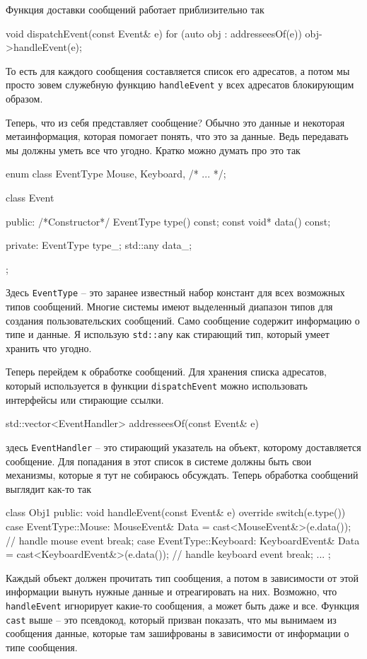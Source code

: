 Функция доставки сообщений работает приблизительно так
\begin{cppcode}
void dispatchEvent(const Event& e) {
  for (auto obj : addresseesOf(e)) {
    obj->handleEvent(e);
  }
}
\end{cppcode}
То есть для каждого сообщения составляется список его адресатов, а потом мы просто зовем служебную функцию \verb"handleEvent" у всех адресатов блокирующим образом.

Теперь, что из себя представляет сообщение?
Обычно это данные и некоторая метаинформация, которая помогает понять, что это за данные.
Ведь передавать мы должны уметь все что угодно.
Кратко можно думать про это так
\begin{cppcode}
enum class EventType {
  Mouse,
  Keyboard,
  /* ... */};

class Event {
public:
  /*Constructor*/
  EventType type() const;
  const void* data() const;
  
private:
  EventType type_;
  std::any data_;
};
\end{cppcode}
Здесь \verb"EventType" -- это заранее известный набор констант для всех возможных типов сообщений.
Многие системы имеют выделенный диапазон типов для создания пользовательских сообщений.
Само сообщение содержит информацию о типе и данные.
Я использую \verb"std::any" как стирающий тип, который умеет хранить что угодно.

Теперь перейдем к обработке сообщений.
Для хранения списка адресатов, который используется в функции \verb"dispatchEvent" можно использовать интерфейсы или стирающие ссылки.
\begin{cppcode}
std::vector<EventHandler> addresseesOf(const Event& e)
\end{cppcode}
здесь \verb"EventHandler" -- это стирающий указатель на объект, которому доставляется сообщение.
Для попадания в этот список в системе должны быть свои механизмы, которые я тут не собираюсь обсуждать.
Теперь обработка сообщений выглядит как-то так
\begin{cppcode}
class Obj1 {
public:
  void handleEvent(const Event& e) override {
    switch(e.type()) {
      case EventType::Mouse:
        MouseEvent& Data = cast<MouseEvent&>(e.data());
        // handle mouse event
      break;
      case EventType::Keyboard:
        KeyboardEvent& Data = cast<KeyboardEvent&>(e.data());
        // handle keyboard event
      break;
      ...
    }
  }
};
\end{cppcode}
Каждый объект должен прочитать тип сообщения, а потом в зависимости от этой информации вынуть нужные данные и отреагировать на них.
Возможно, что \verb"handleEvent" игнорирует какие-то сообщения, а может быть даже и все.
Функция \verb"cast" выше -- это псевдокод, который призван показать, что мы вынимаем из сообщения данные, которые там зашифрованы в зависимости от информации о типе сообщения.

